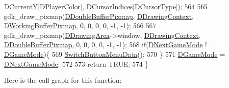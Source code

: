 \begin{DoxyCode}
      \hyperlink{classCApplicationData_a0ba39779ae11c8072258c6ddfebd6052}{DCurrentY}[DPlayerColor], \hyperlink{classCApplicationData_a3f4e69d928f933bba6e1c388c5a720a2}{DCursorIndices}[\hyperlink{classCApplicationData_a931cfbda23231fb441081f231326e7ee}{DCursorType}]);   
564     
565     gdk\_draw\_pixmap(\hyperlink{classCApplicationData_aefb64ec5ca3f791f6d431cfc56b9f3b3}{DDoubleBufferPixmap}, \hyperlink{classCApplicationData_aa6c5bea9bdcc64398e5a3f693661d37c}{DDrawingContext}, 
      \hyperlink{classCApplicationData_afa34cf2780f38dd28c0c811e69d60a97}{DWorkingBufferPixmap}, 0, 0, 0, 0, -1, -1);
566     
567     gdk\_draw\_pixmap(\hyperlink{classCApplicationData_a4735f5d31632313e0b2a1659eb178987}{DDrawingArea}->window, \hyperlink{classCApplicationData_aa6c5bea9bdcc64398e5a3f693661d37c}{DDrawingContext}, 
      \hyperlink{classCApplicationData_aefb64ec5ca3f791f6d431cfc56b9f3b3}{DDoubleBufferPixmap}, 0, 0, 0, 0, -1, -1);
568     \textcolor{keywordflow}{if}(\hyperlink{classCApplicationData_a3b67edeacd70201dcf96fa9fa8aa2107}{DNextGameMode} != \hyperlink{classCApplicationData_a2f906f2b4208ecb2a057e6b62e549685}{DGameMode})\{
569         \hyperlink{classCApplicationData_a2a464fd480c791ab13a1b1ca855e4578}{SwitchButtonMenuData}();
570     \}
571     \hyperlink{classCApplicationData_a2f906f2b4208ecb2a057e6b62e549685}{DGameMode} = \hyperlink{classCApplicationData_a3b67edeacd70201dcf96fa9fa8aa2107}{DNextGameMode};
572     
573     \textcolor{keywordflow}{return} TRUE;
574 \}
\end{DoxyCode}
Here is the call graph for this function\+:\nopagebreak
